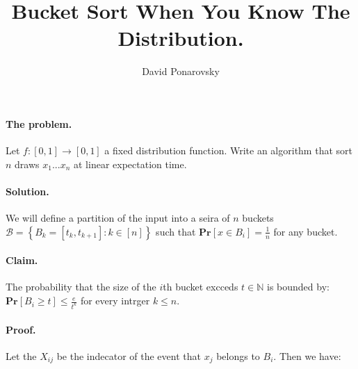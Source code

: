 \documentclass{article}
\newcommand{\prb}[1]{ \mathbf{Pr} \left[ {#1} \right]}
\newcommand{\expp}[1]{ \mathbf{E} \left[ {#1} \right]}
\newcommand{\xij} { X_{ij} }
\begin{document}
\title{Bucket Sort When You Know The Distribution.} 
\author{David Ponarovsky}
\maketitle
{} 
\begin{multicols*}{2}

  \paragraph{The problem.} Let $f: [0,1] \rightarrow [0,1]$ a fixed distribution function. Write an algorithm that sort $n$ draws $x_1 ... x_{n}$ at linear expectation time.  
  \paragraph{Solution.} We will define a partition of the input into a seira of $n$ buckets $\mathcal{B} = \left\{ B_{k} = [t_{k}, t_{k+1} ] : k \in [n]  \right\}$ such that $ \prb{ x \in B_{i}} = \frac{1}{n}$ for any bucket. 
  \paragraph{Claim.} The probability that the size of the $i$th bucket excceds $t \in \mathbb{N}$ is bounded by: $\prb{ B_{i} \ge t}  \le \frac{e}{t^{k}}$ for every intrger $k \le n$.
  \paragraph{Proof.} Let the $\xij$ be the indecator of the event that $x_{j}$ belongs to $B_i$. Then we have:
 

\end{multicols*}
\end{document}
